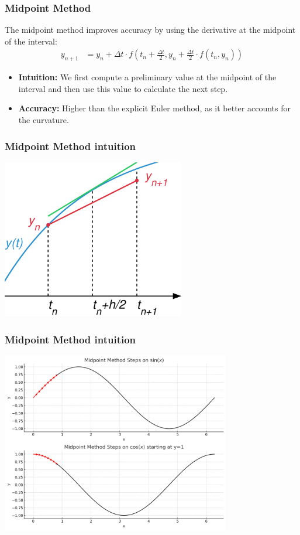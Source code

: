 \documentclass{beamer}
\begin{document}
\begin{frame}
  \frametitle{Midpoint Method}
  The midpoint method improves accuracy by using the derivative at the midpoint of the interval:
  \begin{align*}
    y_{n + 1} &= y_n + \Delta t \cdot f\left(t_n + \frac{\Delta t}{2}, y_n + \frac{\Delta t}{2} \cdot f(t_n, y_n)\right)
  \end{align*}
  \begin{itemize}
    \item \textbf{Intuition:} We first compute a preliminary value at the midpoint of the interval and then use this value to calculate the next step.
    \item \textbf{Accuracy:} Higher than the explicit Euler method, as it better accounts for the curvature.
  \end{itemize}
\end{frame}
\begin{frame}
    \frametitle{Midpoint Method intuition}
    \vspace{-5mm}
    \begin{center}
        \includegraphics[width=0.6\textwidth]{examples/fig/midpoint2.png}
    \end{center}
\end{frame}
\begin{frame}
    \frametitle{Midpoint Method intuition}
    \vspace{-5mm}
    \begin{center}
        \includegraphics[width=0.75\textwidth]{examples/fig/midpoint.png}
    \end{center}
\end{frame}
\end{document}

